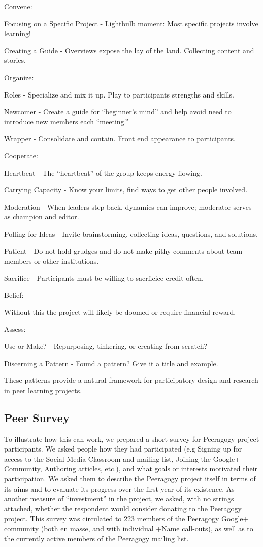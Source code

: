\documentclass{acm_proc_article-sp}
\begin{document}
Convene:

    Focusing on a Specific Project - Lightbulb moment: Most specific projects involve learning!

    Creating a Guide - Overviews expose the lay of the land. Collecting content and stories.

Organize:

    Roles - Specialize and mix it up. Play to participants strengths and skills.

    Newcomer - Create a guide for ``beginner's mind'' and help avoid need to introduce new members each ``meeting.''

    Wrapper - Consolidate and contain. Front end appearance to participants.

Cooperate:

    Heartbeat - The ``heartbeat'' of the group keeps energy flowing.

    Carrying Capacity - Know your limits, find ways to get other people involved.

    Moderation - When leaders step back, dynamics can improve; moderator serves as champion and editor.

    Polling for Ideas - Invite brainstorming, collecting ideas, questions, and solutions.

    Patient - Do not hold grudges and do not make pithy comments about team members or other institutions.

    Sacrifice - Participants must be willing to sacrficice credit often.

Belief:

    Without this the project will likely be doomed or require financial reward.

Assess:

    Use or Make? - Repurposing, tinkering, or creating from scratch?

    Discerning a Pattern - Found a pattern? Give it a title and example.


These patterns provide a natural framework for participatory design and research in peer learning projects.

\subsection{Peer Survey}

To illustrate how this can work, we prepared a short survey for Peeragogy project participants. We asked people how they had participated (e.g Signing up for access to the Social Media Classroom and mailing list, Joining the Google+ Community, Authoring articles, etc.), and what goals or interests motivated their participation. We asked them to describe the Peeragogy project itself in terms of its aims and to evaluate its progress over the first year of its existence. As another measure of ``investment'' in the project, we asked, with no strings attached, whether the respondent would consider donating to the Peeragogy project. This survey was circulated to 223 members of the Peeragogy Google+ community (both en masse, and with individual +Name call-outs), as well as to the currently active members of the Peeragogy mailing list.
\end{document}
